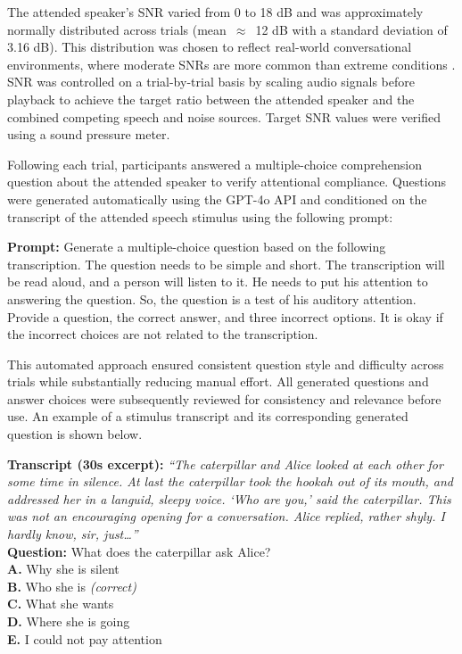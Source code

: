 \documentclass[journal]{IEEEtran}
\begin{document}
The attended speaker's SNR varied from 0 to 18 dB and was approximately normally distributed across trials (mean~$\approx$~12 dB with a standard deviation of 3.16 dB). This distribution was chosen to reflect real-world conversational environments, where moderate SNRs are more common than extreme conditions \cite{pearsons1977speech, smeds2015estimation}. SNR was controlled on a trial-by-trial basis by scaling audio signals before playback to achieve the target ratio between the attended speaker and the combined competing speech and noise sources. Target SNR values were verified using a sound pressure meter.

Following each trial, participants answered a multiple-choice comprehension question about the attended speaker to verify attentional compliance. Questions were generated automatically using the GPT-4o API \cite{hurst2024gpt} and conditioned on the transcript of the attended speech stimulus using the following prompt:
%
\begin{tcolorbox}[colback=gray!5, colframe=black, fontupper=\footnotesize]
\textbf{Prompt:} Generate a multiple-choice question based on the following transcription. The question needs to be simple and short. The transcription will be read aloud, and a person will listen to it. He needs to put his attention to answering the question. So, the question is a test of his auditory attention. Provide a question, the correct answer, and three incorrect options. It is okay if the incorrect choices are not related to the transcription.
\end{tcolorbox}
%
\noindent
This automated approach ensured consistent question style and difficulty across trials while substantially reducing manual effort. All generated questions and answer choices were subsequently reviewed for consistency and relevance before use. An example of a stimulus transcript and its corresponding generated question is shown below.
%
\begin{tcolorbox}[colback=gray!5, colframe=black, fontupper=\footnotesize]
\textbf{Transcript (30s excerpt):} \textit{``The caterpillar and Alice looked at each other for some time in silence. At last the caterpillar took the hookah out of its mouth, and addressed her in a languid, sleepy voice. `Who are you,' said the caterpillar. This was not an encouraging opening for a conversation. Alice replied, rather shyly. I hardly know, sir, just\ldots''} \\[6pt]
\textbf{Question:} What does the caterpillar ask Alice? \\[4pt]
\textbf{A.} Why she is silent \\
\textbf{B.} Who she is \hspace{1em} \textit{(correct)} \\
\textbf{C.} What she wants \\
\textbf{D.} Where she is going \\
\textbf{E.} I could not pay attention
\end{tcolorbox}
\end{document}
